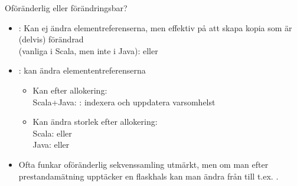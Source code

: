 



\begin{Slide}{Oföränderlig eller förändringsbar?}
\begin{itemize}
\item {}:  Kan ej ändra elementreferenserna, men effektiv på att skapa kopia som är (delvis) förändrad\\(vanliga i Scala, men inte i Java):  eller 

\item {}: kan ändra elemententreferenserna
  \begin{itemize} 
  \item Kan  efter allokering: \\ Scala+Java: : indexera och uppdatera varsomhelst
  \item Kan ändra storlek efter allokering: 
  \\ Scala:  eller 
  \\ Java:  eller 
  \end{itemize}
\item Ofta funkar oföränderlig sekvenssamling utmärkt, men om man efter prestandamätning upptäcker en flaskhals kan man ändra från  till t.ex. .  
\end{itemize}
\end{Slide}




